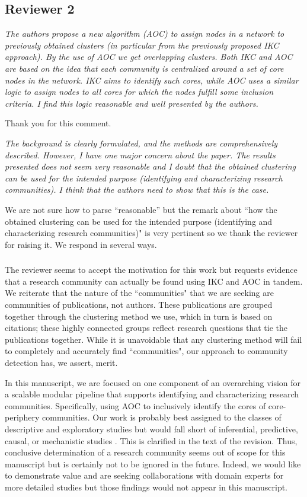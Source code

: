 \documentclass[11pt, oneside]{article}   	%
\begin{document}
\subsection*{Reviewer 2} \emph{The authors propose a new algorithm (AOC) to assign nodes in a network to previously obtained clusters (in particular from the previously proposed IKC approach). By the use of AOC we get overlapping clusters. Both IKC and AOC are based on the idea that each community is centralized around a set of core nodes in the network. IKC aims to identify such cores, while AOC uses a similar logic to assign nodes to all cores for which the nodes fulfill some inclusion criteria. I find this logic reasonable and well presented by the authors.} 

Thank you for this comment.

\emph{The background is clearly formulated, and the methods are comprehensively described. However, I have one major concern about the paper. The results presented does not seem very reasonable and I doubt that the obtained clustering can be used for the intended purpose (identifying and characterizing research communities). I think that the authors need to show that this is the case.}

We are not sure how to parse ``reasonable'' but the remark about ``how the obtained clustering can be used for the intended purpose (identifying and characterizing research communities)" is very pertinent so we thank the reviewer for raising it. We respond in several ways. 

\subsubsection{}The reviewer seems to accept the motivation for this work but requests evidence that a research community can actually be found using IKC and AOC in tandem. We reiterate that the nature of the ``communities" that we are seeking are communities of publications, not authors.  These publications are grouped together through the clustering method we use, which in turn is based on citations; these highly connected groups reflect research questions that tie the publications together.  While it is unavoidable that any clustering method will fail to completely and accurately find ``communities", our approach to community detection has, we assert, merit. 

In this manuscript, we are focused on one component of an overarching vision for a scalable modular pipeline that supports identifying and characterizing research communities. Specifically, using AOC to inclusively identify the cores of core-periphery communities. Our work is probably best assigned to the classes of descriptive and exploratory studies but would fall short of inferential, predictive, causal, or mechanistic studies \cite{leek2015question}. This is clarified in the text of the revision. Thus, conclusive determination of a research community seems out of scope for this manuscript but is certainly not to be ignored in the future.  Indeed, we would like to demonstrate value and are seeking collaborations with domain experts for more detailed studies but those findings would not appear in this manuscript.
\end{document}
